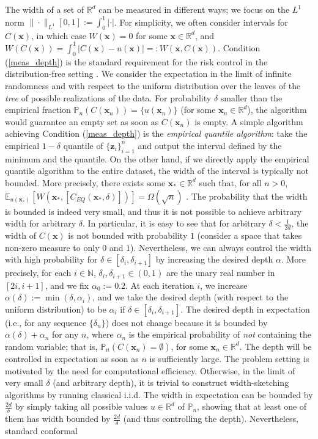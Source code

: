 \documentclass{article} %
\theoremstyle{remark}
\theoremstyle{definition}      %
\begin{document}
The width of a set of $\mathbb{R}^d$ can be measured in different ways; we focus on the $L^1$ norm $\|\cdot\|_{L^1}[0,1] := \int_0^1 |\cdot|$. For simplicity, we often consider intervals for $C(\bm{x})$, in which case $W(\bm{x}) = 0$ for some  $\bm{x} \in \mathbb{R}^d$, and $W(C(\bm{x})) = \int_0^1 |C(\bm{x}) - u(\bm{x})| =: W(\bm{x},C(\bm{x}))$. Condition (\ref{meas_depth}) is the standard requirement for the risk control in the distribution-free setting \citep[see, e.g.,][]{vovk2005algorithmic}. We consider the expectation in the limit of infinite randomness and with respect to the uniform distribution over the leaves of the \emph{tree} of possible realizations of the data. For probability $\delta$ smaller than the empirical fraction $\mathbb{P}_n(C(\bm{x}_n)) = \{ u(\bm{x}_n) \}$ (for some $\bm{x}_n \in \mathbb{R}^d$), the algorithm would guarantee an empty set as soon as $C(\bm{x}_n)$ is empty.  A simple algorithm achieving Condition (\ref{meas_depth}) is the \emph{empirical quantile algorithm}: take the empirical $1 - \delta$ quantile of $\{ \bm z_i \}_{i=1}^{n}$ and output the interval defined by the minimum and the quantile. On the other hand, if we directly apply the empirical quantile algorithm to the entire dataset, the width of the interval is typically not bounded. More precisely, there exists some $\bm{x}_* \in \mathbb{R}^d$ such that, for all $n > 0$, $\mathbb{E}_{u(\bm{x}_*)}\left[ W(\bm{x}_*,[C_{EQ}(\bm{x}_*, \delta)]) \right] = \Omega(\sqrt{n})$ \citep[see Sec. 1.3.1 in][]{shao2003mathematical}. The probability that the width is bounded is indeed very small, and thus it is not possible to achieve arbitrary width for arbitrary $\delta$. In particular, it is easy to see that for arbitrary $\delta < \frac{1}{2d}$, the width of $C(\bm{x})$ is not bounded with probability $1$ (consider a space that takes non-zero measure to only $0$ and $1$). Nevertheless, we can always control the width with high probability for $\delta \in [\delta_i,\delta_{i+1}]$ by increasing the desired depth $\alpha$. More precisely, for each $i \in \mathbb{N}$, $\delta_i,\delta_{i+1} \in (0,1)$ are the unary real number in $[2i,i+1]$, and we fix $\alpha_0 := 0.2$. At each iteration $i$, we increase $\alpha(\delta) := \min(\delta, \alpha_i)$, and we take the desired depth (with respect to the uniform distribution) to be $\alpha_i$ if $\delta \in [\delta_i,\delta_{i+1}]$. The desired depth in expectation (i.e., for any sequence $\{\delta_n \}$) does not change because it is bounded by $\alpha(\delta) + \alpha_n$ for any $n$, where $\alpha_n$ is the empirical probability of \emph{not} containing the random variable; that is,  $\mathbb{P}_n(C(\bm{x}_n) = \emptyset)$, for some $\bm{x}_n \in \mathbb{R}^d$. The depth will be controlled in expectation as soon as $n$ is sufficiently large. The problem setting is motivated by the need for computational efficiency. Otherwise, in the limit of very small $\delta$ (and arbitrary depth), it is trivial to construct width-sketching algorithms by running classical i.i.d. The width in expectation can be bounded by $\frac{2d}{\delta}$ by simply taking all possible values $u \in \mathbb{R}^d$  of $\mathbb{P}_n$, showing that at least one of them has width bounded by $\frac{2d}{\delta}$ (and thus controlling the depth). Nevertheless,  standard conformal 
\end{document}
